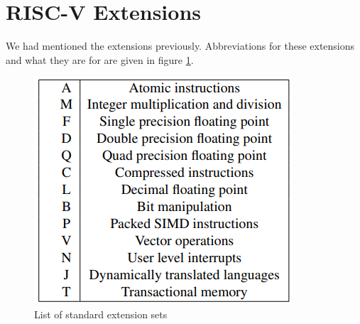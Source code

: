 \section{RISC-V Extensions}
We had mentioned the extensions previously. Abbreviations for these extensions and what they are for are given in figure \ref{fig:list_of_standard_extension_sets}.
\begin{figure}[h!]
    \centering
    \includegraphics{riscv/list_of_standard_extension_sets.png}
    \caption{List of standard extension sets \cite{erfan}}
    \label{fig:list_of_standard_extension_sets}
\end{figure}

